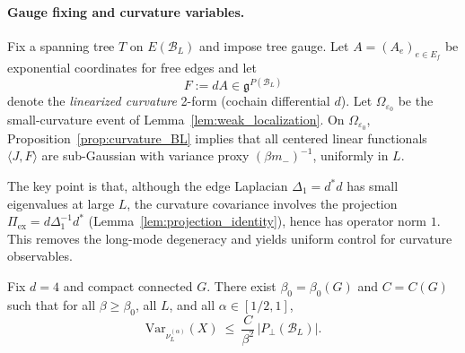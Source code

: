 \paragraph{Gauge fixing and curvature variables.}
Fix a spanning tree $T$ on $E(\mathcal B_L)$ and impose tree gauge.
Let $A=(A_e)_{e\in E_f}$ be exponential coordinates for free edges and let
\[
F:=dA\in \mathfrak g^{P(\mathcal B_L)}
\]
denote the \emph{linearized curvature} 2-form (cochain differential $d$).
Let $\Omega_{\varepsilon_0}$ be the small-curvature event of Lemma~\ref{lem:weak_localization}.
On $\Omega_{\varepsilon_0}$, Proposition~\ref{prop:curvature_BL} implies that all centered linear functionals
$\langle J,F\rangle$ are sub-Gaussian with variance proxy $(\beta m_-)^{-1}$, uniformly in $L$.

\medskip
The key point is that, although the edge Laplacian $\Delta_1=d^*d$ has small eigenvalues at large $L$, the curvature covariance involves
the projection $\Pi_{\mathrm{ex}}=d\Delta_1^{-1}d^*$ (Lemma~\ref{lem:projection_identity}), hence has operator norm $1$.
This removes the long-mode degeneracy and yields uniform control for curvature observables.

\begin{lemma}\label{lem:VarX_beta2}
Fix $d=4$ and compact connected $G$.
There exist $\beta_0=\beta_0(G)$ and $C=C(G)$ such that for all $\beta\ge\beta_0$, all $L$, and all $\alpha\in[1/2,1]$,
\begin{equation}\label{eq:VarX_bound_beta2}
\mathrm{Var}_{\nu_L^{(\alpha)}}(X)\ \le\ \frac{C}{\beta^2}\,|P_\perp(\mathcal B_L)|.
\end{equation}
\end{lemma}

